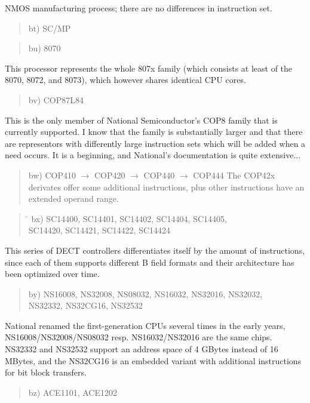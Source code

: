 \documentclass[12pt,twoside]{report}
\begin{document}
NMOS manufacturing process; there are no differences in instruction
set.
\begin{quote}
bt) SC/MP
\end{quote}
\begin{quote}
bu) 8070
\end{quote}
This processor represents the whole 807x family (which consists at least
of the 8070, 8072, and 8073), which however shares identical CPU cores.
\begin{quote}
bv) COP87L84
\end{quote}
This is the only member of National Semiconductor's COP8 family that
is currently supported.  I know that the family is substantially
larger and that there are representors with differently large
instruction sets which will be added when a need occurs.  It is a
beginning, and National's documentation is quite extensive...
\begin{quote}
bw) COP410 $\rightarrow$ COP420 $\rightarrow$ COP440 $\rightarrow$ COP444
The COP42x derivates offer some additional instructions, plus other
instructions have an extended operand range.
\end{quote}
\begin{quote}
\begin{tabbing}
\hspace{0.7cm} \= \kill
bx) \> SC14400, SC14401, SC14402, SC14404, SC14405, \\
    \> SC14420, SC14421, SC14422, SC14424 \\
\end{tabbing}
\end{quote}
This series of DECT controllers differentiates itself by the amount of
instructions, since each of them supports different B field formats and
their architecture has been optimized over time.
\begin{quote}
by) NS16008, NS32008, NS08032, NS16032, NS32016, NS32032, \\
    NS32332, NS32CG16, NS32532
\end{quote}
National renamed the first-generation CPUs several times in the early
years, NS16008/NS32008/NS08032 resp. NS16032/NS32016 are the same chips.
NS32332 and NS32532 support an address space of  4 GBytes instead of 16
MBytes, and the NS32CG16 is an embedded variant with additional instructions
for bit block transfers.
\begin{quote}
bz) ACE1101, ACE1202
\end{quote}
\end{document}
